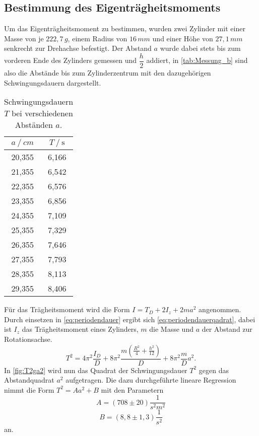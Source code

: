 \subsection{Bestimmung des Eigenträgheitsmoments}
\label{subsec:b}
Um das Eigenträgheitsmoment zu bestimmen, wurden zwei Zylinder mit einer Masse von je $222,7 \,\unit{g}$, einem Radius von $16 \,\unit{mm}$ und einer Höhe von $27,1 \,\unit{mm}$ senkrecht zur Drehachse befestigt.
Der Abstand $a$ wurde dabei stets bis zum vorderen Ende des Zylinders gemessen und $\dfrac{h}{2}$ addiert, in \autoref{tab:Messung_b} 
sind also die Abstände bis zum Zylinderzentrum mit den dazugehörigen Schwingungsdauern dargestellt.

\begin{table}[H] %
  \centering
  \begin{tabular}{S[table-format=2.3] S[table-format=2.2]}
      \toprule
      {$a \mathbin{/}\unit{cm}$} & {$T \mathbin{/} \unit{\second}$}\\
      ,355 & 6,166 \\
           21,355 & 6,542 \\
           22,355 & 6,576 \\
           23,355 & 6,856 \\  
           24,355 & 7,109 \\
           25,355 & 7,329 \\
           26,355 & 7,646 \\
           27,355 & 7,793 \\
           28,355 & 8,113 \\
           29,355 & 8,406 \\
      \bottomrule
  \end{tabular}
  \caption{Schwingungsdauern $T$ bei verschiedenen Abständen $a$.}
  \label{tab:Messung_b}
\end{table}
Für das Trägheitsmoment wird die Form $ I = T_D + 2I_z + 2m a^2$ angenommen. 
Durch einsetzen in \eqref{eq:periodendauer} ergibt sich \eqref{eq:periodendauerqadrat}, dabei ist $I_z$ das Trägheitsmoment eines Zylinders, $m$ die Masse und $a$ der Abstand zur Rotationsachse.
\begin{equation}
  T^2 = 4 \pi^2 \frac{I_D}{D} + 8 \pi^2 \frac{m (\frac{R^2}{4} + \frac{h^2}{12})}{D}+ 8 \pi^2 \frac{m}{D} a^2 .
  \label{eq:periodendauerqadrat}
\end{equation}
In \autoref{fig:T2ga2} wird nun das Quadrat der Schwingungsdauer $T^2$ gegen das Abstandquadrat $a^2$ aufgetragen.
Die dazu durchgeführte lineare Regression nimmt die Form $T^2 = A  a^2 + B $ mit den Parametern
\begin{equation*}
  A = (708 \pm 20) \dfrac{1}{s^2m^2}
\end{equation*}
\begin{equation*}
 B = (8,8 \pm 1,3) \dfrac{1}{s^2} 
\end{equation*}
an.

